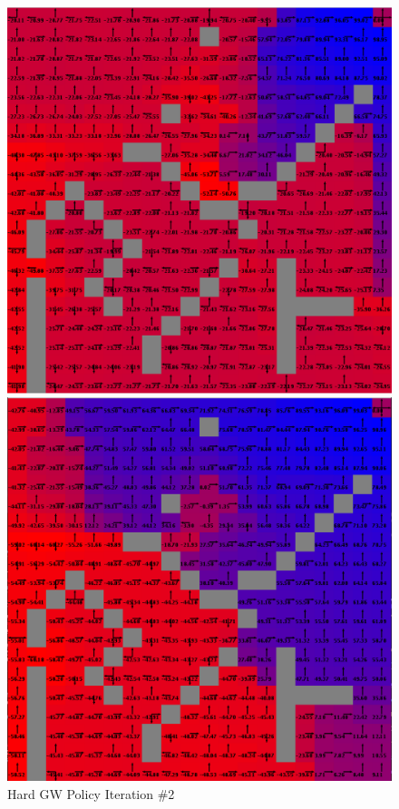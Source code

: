 \documentclass[h]{article}
\begin{document}
   \begin{figure}[H]
      \includegraphics[width=1\textwidth,keepaspectratio]{hard-policy-2.png} 
      \caption*{Hard GW Policy Iteration \#2} 
   \endminipage\hfill
      \includegraphics[width=1\textwidth,keepaspectratio]{hard-policy-5.png} 

\end{figure}
\end{document}
